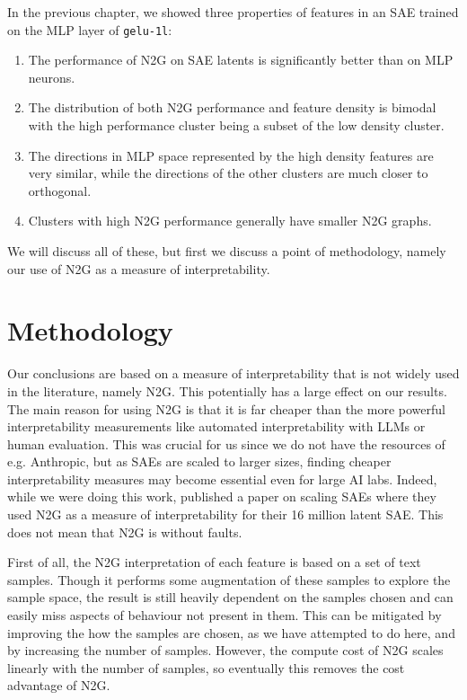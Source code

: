 In the previous chapter, we showed three properties of features in an \ac{SAE} trained on the \ac{MLP} layer of \texttt{gelu-1l}: 
\begin{enumerate}[ref={observation~\arabic*}]
    \item The performance of \ac{N2G} on \ac{SAE} latents is significantly better than on \ac{MLP} neurons.\label{obs:n2g_performance}
    \item The distribution of both \ac{N2G} performance and feature density is bimodal with the high performance cluster being a subset of the low density cluster.\label{obs:bimodal}
    \item The directions in \ac{MLP} space represented by the high density features are very similar, while the directions of the other clusters are much closer to orthogonal.\label{obs:directions}
    \item Clusters with high \ac{N2G} performance generally have smaller \ac{N2G} graphs.\label{obs:n2g_size}
\end{enumerate}
We will discuss all of these, but first we discuss a point of methodology, namely our use of \ac{N2G} as a measure of interpretability.

\section{Methodology}
\label{sec:n2g_interpretability}
Our conclusions are based on a measure of interpretability that is not widely used in the literature, namely \ac{N2G}.
This potentially has a large effect on our results.
The main reason for using \ac{N2G} is that it is far cheaper than the more powerful interpretability measurements like automated interpretability with \ac{LLM}s or human evaluation.
This was crucial for us since we do not have the resources of e.g. Anthropic, but as \acp{SAE} are scaled to larger sizes, finding cheaper interpretability measures may become essential even for large AI labs.
Indeed, while we were doing this work, \textcite{gao_scaling_2024} published a paper on scaling \acp{SAE} where they used \ac{N2G} as a measure of interpretability for their 16 million latent SAE.
This does not mean that \ac{N2G} is without faults.

First of all, the \ac{N2G} interpretation of each feature is based on a set of text samples.
Though it performs some augmentation of these samples to explore the sample space, the result is still heavily dependent on the samples chosen and can easily miss aspects of behaviour not present in them.
This can be mitigated by improving the how the samples are chosen, as we have attempted to do here, and by increasing the number of samples.
However, the compute cost of \ac{N2G} scales linearly with the number of samples, so eventually this removes the cost advantage of \ac{N2G}.

